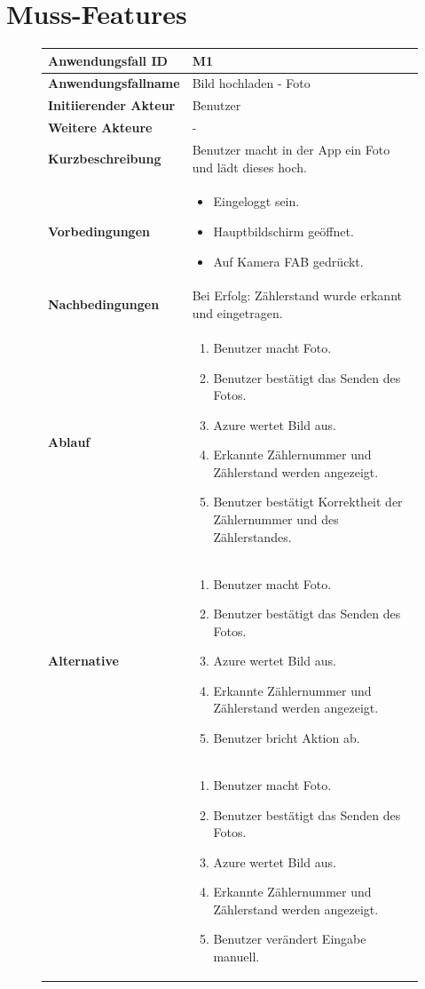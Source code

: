 \section{Muss-Features}
\begin{figure}[H]
	\centering
	\begin{tabularx}{\textwidth}{ X | X }
		\textbf{Anwendungsfall ID} & M1 \\ \hline
		\textbf{Anwendungsfallname} & Bild hochladen  - Foto \\ \hline
		\textbf{Initiierender Akteur} & Benutzer \\ \hline
		\textbf{Weitere Akteure} & - \\ \hline
		\textbf{Kurzbeschreibung} & Benutzer macht in der App ein Foto und lädt dieses hoch.   \\ \hline
		\textbf{Vorbedingungen} & 
		\begin {itemize}
			\item Eingeloggt sein. 
			\item Hauptbildschirm geöffnet.
			\item Auf Kamera FAB gedrückt.
		\end{itemize} \\ \hline
		\textbf{Nachbedingungen} & Bei Erfolg: Zählerstand wurde erkannt und eingetragen. \\ \hline
		\textbf{Ablauf} &
		\begin{enumerate}
			\item Benutzer macht Foto.
			\item Benutzer bestätigt das Senden des Fotos.
			\item Azure wertet Bild aus.
			\item Erkannte Zählernummer und Zählerstand werden angezeigt.
			\item Benutzer bestätigt Korrektheit der Zählernummer und des Zählerstandes.
		\end{enumerate} \\ \hline
		\textbf{Alternative} &
		\begin{enumerate}
			\item Benutzer macht Foto.
			\item Benutzer bestätigt das Senden des Fotos.
			\item Azure wertet Bild aus.
			\item Erkannte Zählernummer und Zählerstand werden angezeigt.
			\item Benutzer bricht Aktion ab.
		\end{enumerate} \\ &
		\begin{enumerate}
			\item Benutzer macht Foto.
			\item Benutzer bestätigt das Senden des Fotos.
			\item Azure wertet Bild aus.
			\item Erkannte Zählernummer und Zählerstand werden angezeigt.
			\item Benutzer verändert Eingabe manuell.
		\end{enumerate} \\


	\end{tabularx}
\end{figure}

